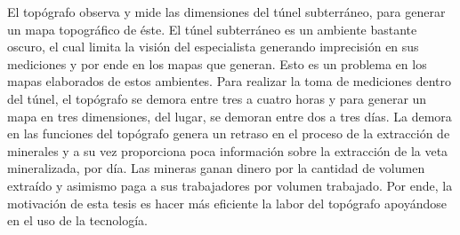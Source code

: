 El topógrafo observa y mide las dimensiones del túnel subterráneo, para generar un mapa 
topográfico de éste. El túnel subterráneo es un ambiente bastante oscuro, el 
cual limita la visión del especialista generando imprecisión en sus mediciones y por ende en 
los mapas que generan. Esto es un problema en los mapas elaborados de estos ambientes. Para 
realizar la toma de mediciones dentro del túnel, el topógrafo se demora entre tres a cuatro 
horas y para generar un mapa en tres dimensiones, del lugar, se demoran entre dos a tres 
días. La demora en las funciones del topógrafo genera un retraso en el proceso de la extracción 
de minerales y a su vez proporciona poca información sobre la extracción de la veta 
mineralizada, por día. Las mineras ganan dinero por la cantidad de volumen extraído y asimismo
paga a sus trabajadores por volumen trabajado. Por ende, la motivación de esta tesis es hacer 
más eficiente la labor del topógrafo apoyándose en el uso de la tecnología. 





